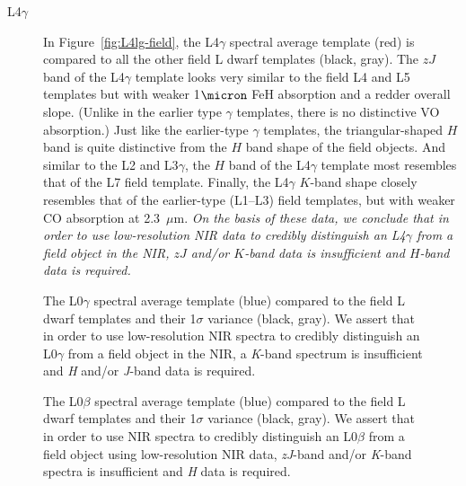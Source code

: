 \documentclass[12pt]{aastex6}
\begin{document}
\begin{description}
\item[L4$\gamma$]{
In Figure~\ref{fig:L4lg-field}, the L4$\gamma$ spectral average template (red) is compared to all the other field L dwarf templates (black, gray).
The $zJ$ band of the L4$\gamma$ template looks very similar to the field L4 and L5 templates but with weaker 1$\micron$ FeH absorption and a redder overall slope. (Unlike in the earlier type $\gamma$ templates, there is no distinctive VO absorption.)
Just like the earlier-type $\gamma$ templates, the triangular-shaped $H$ band is quite distinctive from the $H$ band shape of the field objects. And similar to the L2 and L3$\gamma$, the $H$ band of the L4$\gamma$ template most resembles that of the L7 field template.
Finally, the L4$\gamma$ $K$-band shape closely resembles that of the earlier-type (L1--L3) field templates, but with weaker CO absorption at 2.3~$\mu$m.
\emph{On the basis of these data, we conclude that in order to use low-resolution NIR data to credibly distinguish an L4$\gamma$ from a field object in the NIR, $zJ$ and/or $K$-band data is insufficient and $H$-band data is required.}
}
\end{description}


\begin{figure}
    \caption{The L0$\gamma$ spectral average template (blue) compared to the field L dwarf templates and their 1$\sigma$ variance (black, gray). We assert that in order to use low-resolution NIR spectra to credibly distinguish an L0$\gamma$ from a field object in the NIR, a \emph{K}-band spectrum is insufficient and \emph{H} and/or \emph{J}-band data is required.}
    \label{fig:L0lg-field}
\end{figure}

\begin{figure}
    \caption{The L0$\beta$ spectral average template (blue) compared to the field L dwarf templates and their 1$\sigma$ variance (black, gray). We assert that in order to use NIR spectra to credibly distinguish an L0$\beta$ from a field object using low-resolution NIR data, \emph{zJ}-band and/or \emph{K}-band spectra is insufficient and \emph{H} data is required.}
    \label{fig:L0b-field}
\end{figure}
\end{document}
